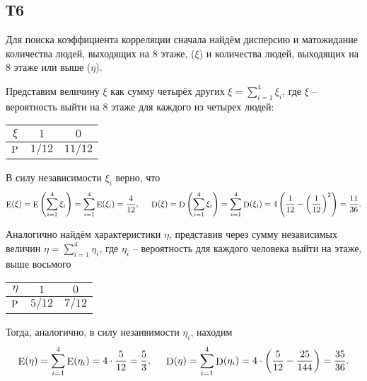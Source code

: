 \subsection*{Т6}

Для поиска коэффициента корреляции сначала найдём дисперсию и матожидание количества людей, выходящих на 8 этаже, ($\xi$) и количества людей, выходящих на 8 этаже или выше ($\eta$).

Представим величину $\xi$ как сумму четырёх других $\xi = \sum_{i=1}^4 \xi_i$, где $\xi$ -- вероятность выйти на 8 этаже для каждого из четырех людей:
\begin{center}
    \begin{tabular}{c|c|c|}
        $\xi$ & $1$ & $0$  \\
        \hline
        $\P$ & $1/12$ & $11/12$ \\
    \end{tabular}
\end{center}
В силу независимости $\xi_i$ верно, что
\begin{equation*}
    \E(\xi) = \E\left(
        \sum_{i=1}^{4} \xi_i
    \right) = \sum_{i=1}^{4} \E(\xi_i) = \frac{4}{12},
    \hspace{5 mm}
    \D(\xi) = \D\left(
        \sum_{i=1}^{4} \xi_i
    \right) = \sum_{i=1}^{4} \D(\xi_i) = 4
    \left(\frac{1}{12} - \left(\frac{1}{12}\right)^2\right) = \frac{11}{36}.
\end{equation*}

Аналогично найдём характеристики $\eta$, представив через сумму независимых величин $\eta = \sum_{i=1}^{4} \eta_i$, где $\eta_i$ -- вероятность для каждого человека выйти на этаже, выше восьмого
\begin{center}
    \begin{tabular}{c|c|c|}
        $\eta$ & $1$ & $0$  \\
        \hline
        $\P$ & $5/12$ & $7/12$ \\
    \end{tabular}
\end{center}
Тогда, аналогично, в силу незаивимости $\eta_i$, находим
\begin{equation*}
    \E (\eta) = \sum_{i=1}^{4} \E(\eta_i) = 4 \cdot \frac{5}{12} = \frac{5}{3},
    \hspace{5 mm}
    \D (\eta) = \sum_{i=1}^{4} \D (\eta_i) = 4 \cdot \left(
        \frac{5}{12} - \frac{25}{144}
    \right) = \frac{35}{36}.
\end{equation*}

